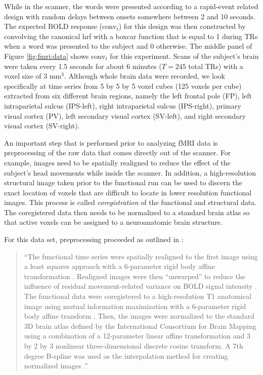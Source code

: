 While in the scanner, the words were presented according to a rapid-event related design with random delays between onsets somewhere between 2 and 10 seconds. The expected BOLD response ($\mbox{conv}_t$) for this design was then constructed by convolving the canonical hrf with a boxcar function that is equal to 1 during TRs when a word was presented to the subject and 0 otherwise. The middle panel of Figure \ref{fig:fmri:data} shows $\mbox{conv}_t$ for this experiment. Scans of the subject's brain were taken every 1.5 seconds for about 6 minutes ($T = 245$ total TRs) with a voxel size of 3 $\mbox{mm}^3$. Although whole brain data were recorded, we look specifically at time series from 5 by 5 by 5 voxel cubes (125 voxels per cube) extracted from six different brain regions, namely the left frontal pole (FP), left intraparietal sulcus (IPS-left), right intraparietal sulcus (IPS-right), primary visual cortex (PV), left secondary visual cortex (SV-left), and right secondary visual cortex (SV-right).

An important step that is performed prior to analyzing fMRI data is preprocessing of the raw data that comes directly out of the scanner. For example, images need to be spatially realigned to reduce the effect of the subject's head movements while inside the scanner. In addition, a high-resolution structural image taken prior to the functional run can be used to discern the exact location of voxels that are difficult to locate in lower resolution functional images. This process is called \emph{coregistration} of the functional and structural data. The coregistered data then needs to be normalized to a standard brain atlas so that active voxels can be assigned to a neuroanatomic brain structure.

For this data set, preprocessing proceeded as outlined in \citet{bennett:miller:2013}:
\begin{quote}
\dsp
``The functional time series were spatially realigned to the first image using a least squares approach with a 6-parameter rigid body affine transformation \citep{friston:ash:spreg:1995}. Realigned images were then ``unwarped'' to reduce the influence of residual movement-related variance on BOLD signal intensity \citep{andersson:deform:2001}. The functional data were coregistered to a high-resolution T1 anatomical image using mutual information maximization with a 6-parameter rigid body affine transform \citep{ashburner:neelin:reg:1997}. Then, the images were normalized to the standard 3D brain atlas defined by the International Consortium for Brain Mapping using a combination of a 12-parameter linear affine transformation and 3 by 2 by 3 nonlinear three-dimensional discrete cosine transform. A 7th degree B-spline was used as the interpolation method for creating normalized images \citep{ashburner:friston:spnorm:1999,mazz:toga:atlas:1995}.''
\end{quote}

